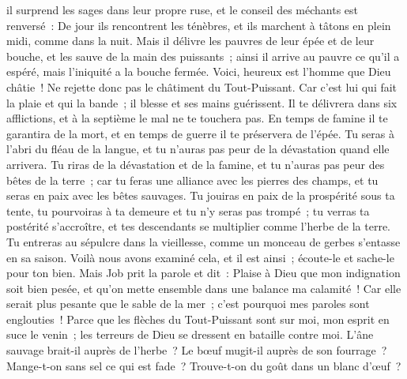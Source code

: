 \begin{multicols}{2}
il surprend les sages dans leur propre ruse, et le conseil des méchants est renversé~:
De jour ils rencontrent les ténèbres, et ils marchent à tâtons en plein midi, comme dans la nuit.
Mais il délivre les pauvres de leur épée et de leur bouche, et les sauve de la main des puissants~;
ainsi il arrive au pauvre ce qu'il a espéré, mais l'iniquité a la bouche fermée.
Voici, heureux est l'homme que Dieu châtie~! Ne rejette donc pas le châtiment du Tout-Puissant.
Car c'est lui qui fait la plaie et qui la bande~; il blesse et ses mains guérissent.
Il te délivrera dans six afflictions, et à la septième le mal ne te touchera pas.
En temps de famine il te garantira de la mort, et en temps de guerre il te préservera de l'épée.
Tu seras à l'abri du fléau de la langue, et tu n'auras pas peur de la dévastation quand elle arrivera.
Tu riras de la dévastation et de la famine, et tu n'auras pas peur des bêtes de la terre~;
car tu feras une alliance avec les pierres des champs, et tu seras en paix avec les bêtes sauvages.
Tu jouiras en paix de la prospérité sous ta tente, tu pourvoiras à ta demeure et tu n'y seras pas trompé~;
tu verras ta postérité s'accroître, et tes descendants se multiplier comme l'herbe de la terre.
Tu entreras au sépulcre dans la vieillesse, comme un monceau de gerbes s'entasse en sa saison.
Voilà nous avons examiné cela, et il est ainsi~; écoute-le et sache-le pour ton bien.
\VerseOne{}Mais Job prit la parole et dit~:
Plaise à Dieu que mon indignation soit bien pesée, et qu'on mette ensemble dans une balance ma calamité~!
Car elle serait plus pesante que le sable de la mer~; c'est pourquoi mes paroles sont englouties~!
Parce que les flèches du Tout-Puissant sont sur moi, mon esprit en suce le venin~; les terreurs de Dieu se dressent en bataille contre moi.
L'âne sauvage brait-il auprès de l'herbe~? Le bœuf mugit-il auprès de son fourrage~?
Mange-t-on sans sel ce qui est fade~? Trouve-t-on du goût dans un blanc d'œuf~?

\end{multicols}
